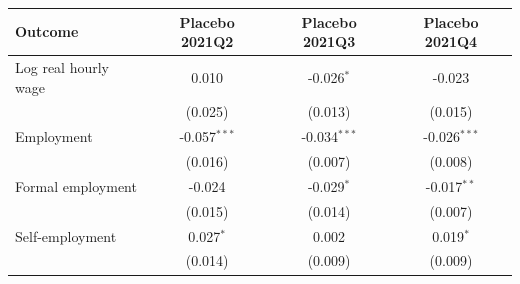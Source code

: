 \begin{tabular}{lccc}
\toprule
Outcome & Placebo 2021Q2 & Placebo 2021Q3 & Placebo 2021Q4 \\
\midrule
Log real hourly wage & 0.010 & -0.026$^{*}$ & -0.023 \\
 & (0.025) & (0.013) & (0.015) \\
Employment & -0.057$^{***}$ & -0.034$^{***}$ & -0.026$^{***}$ \\
 & (0.016) & (0.007) & (0.008) \\
Formal employment & -0.024 & -0.029$^{*}$ & -0.017$^{**}$ \\
 & (0.015) & (0.014) & (0.007) \\
Self-employment & 0.027$^{*}$ & 0.002 & 0.019$^{*}$ \\
 & (0.014) & (0.009) & (0.009) \\
\bottomrule
\end{tabular}

